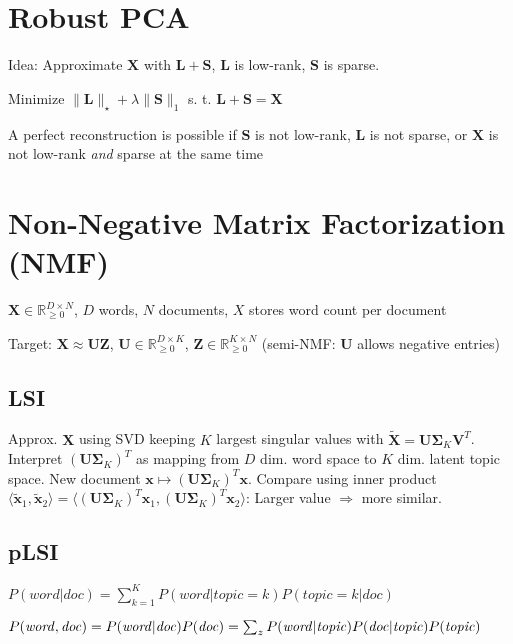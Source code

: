 \documentclass[a4paper, 11pt, landscape]{article}
\begin{document}
\begin{multicols*}{3}
\section{Robust PCA}
\begin{compactitem}
	\item Idea: Approximate $\mathbf{X}$ with $\mathbf{L} + \mathbf{S}$, $\mathbf{L}$ is low-rank, $\mathbf{S}$ is sparse.
	\item Minimize $\|\mathbf{L}\|_\star + \lambda \|\mathbf{S}\|_1$ s. t. $\mathbf{L} + \mathbf{S} = \mathbf{X}$
	\item A perfect reconstruction is possible if $\mathbf{S}$ is not low-rank, $\mathbf{L}$ is not sparse, or $\mathbf{X}$ is not low-rank \textit{and} sparse at the same time
\end{compactitem}

\section{Non-Negative Matrix Factorization (NMF)}
\begin{inparaitem}[\color{red}\textbullet]
	\item $\mathbf{X} \in \mathbb{R}^{D \times N}_{\geq 0}$, $D$ words, $N$ documents, $X$ stores word count per document
	\item Target: $\mathbf{X} \approx \mathbf{UZ}$, $\mathbf{U} \in \mathbb{R}^{D \times K}_{\geq 0}$, $\mathbf{Z} \in \mathbb{R}^{K \times N}_{\geq 0}$ (semi-NMF: $\mathbf{U}$ allows negative entries)
\end{inparaitem}

\subsection{LSI}
Approx. $\mathbf{X}$ using SVD keeping $K$ largest singular values with $\tilde{\mathbf{X}} = \mathbf{U} \boldsymbol{\Sigma}_K \mathbf{V}^T$. Interpret $(\mathbf{U} \boldsymbol{\Sigma}_K)^T$ as mapping from $D$ dim. word space to $K$ dim. latent topic space. New document $\mathbf{x} \mapsto (\mathbf{U} \boldsymbol{\Sigma}_K)^T \mathbf{x}$. Compare using inner product $\langle \tilde{\mathbf{x}}_1, \tilde{\mathbf{x}}_2 \rangle = \langle (\mathbf{U} \boldsymbol{\Sigma}_K)^T \mathbf{x}_1, (\mathbf{U} \boldsymbol{\Sigma}_K)^T \mathbf{x}_2 \rangle$: Larger value $\Rightarrow$ more similar.

\subsection{pLSI}
\begin{compactitem}
	\item $P(\mathit{word} | \mathit{doc}) = \sum_{k=1}^K P(\mathit{word} | \mathit{topic} = k) P(\mathit{topic} = k | \mathit{doc})$
	\item $P(\mathit{word}, \mathit{doc}) = P(\mathit{word} | \mathit{doc}) P(\mathit{doc}) \break= \sum_z P(\mathit{word} | \mathit{topic}) P(\mathit{doc} | \mathit{topic}) P(\mathit{topic})$
\end{compactitem}


\end{multicols*}
\end{document}
